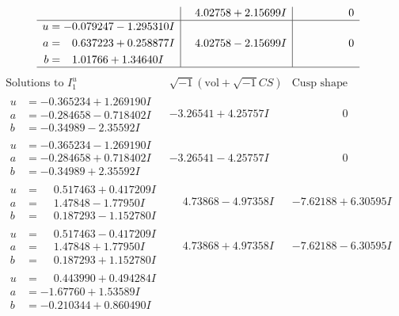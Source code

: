 \documentclass[1p]{elsarticle_modified}
\theoremstyle{definition}
\newcommand{\I}{\sqrt{-1}}
\begin{document}
$$\begin{array}{c|c|c}
 & \phantom{-}4.02758 + 2.15699 I & \phantom{-0.000000 } 0 \\ \hline\begin{aligned}
u &= -0.079247 - 1.295310 I \\
a &= \phantom{-}0.637223 + 0.258877 I \\
b &= \phantom{-}1.01766 + 1.34640 I\end{aligned}
 & \phantom{-}4.02758 - 2.15699 I & \phantom{-0.000000 } 0\\
 \hline 
 \end{array}$$\newpage$$\begin{array}{c|c|c}  
\text{Solutions to }I^u_{1}& \I (\text{vol} + \sqrt{-1}CS) & \text{Cusp shape}\\
 \hline 
\begin{aligned}
u &= -0.365234 + 1.269190 I \\
a &= -0.284658 - 0.718402 I \\
b &= -0.34989 - 2.35592 I\end{aligned}
 & -3.26541 + 4.25757 I & \phantom{-0.000000 } 0 \\ \hline\begin{aligned}
u &= -0.365234 - 1.269190 I \\
a &= -0.284658 + 0.718402 I \\
b &= -0.34989 + 2.35592 I\end{aligned}
 & -3.26541 - 4.25757 I & \phantom{-0.000000 } 0 \\ \hline\begin{aligned}
u &= \phantom{-}0.517463 + 0.417209 I \\
a &= \phantom{-}1.47848 - 1.77950 I \\
b &= \phantom{-}0.187293 - 1.152780 I\end{aligned}
 & \phantom{-}4.73868 - 4.97358 I & -7.62188 + 6.30595 I \\ \hline\begin{aligned}
u &= \phantom{-}0.517463 - 0.417209 I \\
a &= \phantom{-}1.47848 + 1.77950 I \\
b &= \phantom{-}0.187293 + 1.152780 I\end{aligned}
 & \phantom{-}4.73868 + 4.97358 I & -7.62188 - 6.30595 I \\ \hline\begin{aligned}
u &= \phantom{-}0.443990 + 0.494284 I \\
a &= -1.67760 + 1.53589 I \\
b &= -0.210344 + 0.860490 I\end{aligned}

\end{array}$$
\end{document}
